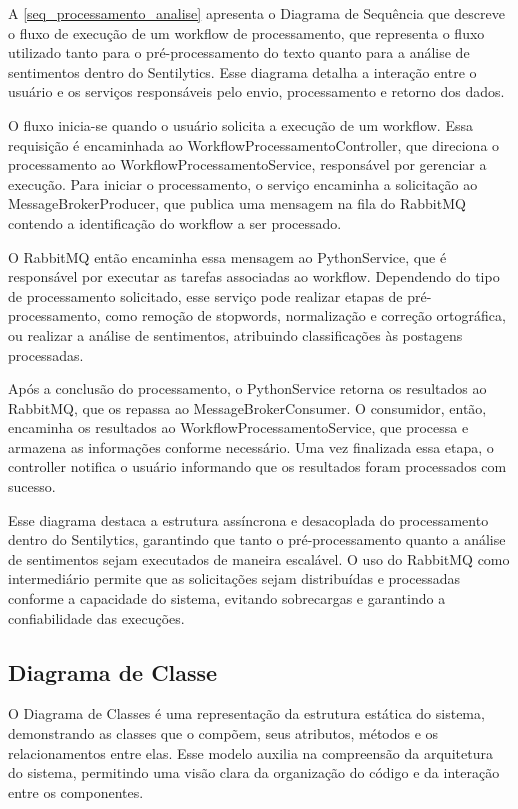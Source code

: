 \documentclass[
	12pt,				%
	oneside,			%
	a4paper,			%
	english,			%
	french,				%
	spanish,			%
	brazil				%
	]{abntex2}
\begin{document}
A \autoref{seq_processamento_analise} apresenta o Diagrama de Sequência
que descreve o fluxo de execução de um workflow de processamento, que
representa o fluxo utilizado tanto para o pré-processamento do texto
quanto para a análise de sentimentos dentro do Sentilytics. Esse
diagrama detalha a interação entre o usuário e os serviços responsáveis
pelo envio, processamento e retorno dos dados.

O fluxo inicia-se quando o usuário solicita a execução de um workflow.
Essa requisição é encaminhada ao WorkflowProcessamentoController, que
direciona o processamento ao WorkflowProcessamentoService, responsável
por gerenciar a execução. Para iniciar o processamento, o serviço
encaminha a solicitação ao MessageBrokerProducer, que publica uma
mensagem na fila do RabbitMQ contendo a identificação do workflow a ser
processado.

O RabbitMQ então encaminha essa mensagem ao PythonService, que é
responsável por executar as tarefas associadas ao workflow. Dependendo
do tipo de processamento solicitado, esse serviço pode realizar etapas
de pré-processamento, como remoção de stopwords, normalização e correção
ortográfica, ou realizar a análise de sentimentos, atribuindo
classificações às postagens processadas.

Após a conclusão do processamento, o PythonService retorna os resultados
ao RabbitMQ, que os repassa ao MessageBrokerConsumer. O consumidor,
então, encaminha os resultados ao WorkflowProcessamentoService, que
processa e armazena as informações conforme necessário. Uma vez
finalizada essa etapa, o controller notifica o usuário informando que os
resultados foram processados com sucesso.

Esse diagrama destaca a estrutura assíncrona e desacoplada do
processamento dentro do Sentilytics, garantindo que tanto o
pré-processamento quanto a análise de sentimentos sejam executados de
maneira escalável. O uso do RabbitMQ como intermediário permite que as
solicitações sejam distribuídas e processadas conforme a capacidade do
sistema, evitando sobrecargas e garantindo a confiabilidade das
execuções.

\hypertarget{diagrama-de-classe}{%
\subsection{Diagrama de Classe}\label{diagrama-de-classe}}

O Diagrama de Classes é uma representação da estrutura estática do
sistema, demonstrando as classes que o compõem, seus atributos, métodos
e os relacionamentos entre elas. Esse modelo auxilia na compreensão da
arquitetura do sistema, permitindo uma visão clara da organização do
código e da interação entre os componentes.
\end{document}
